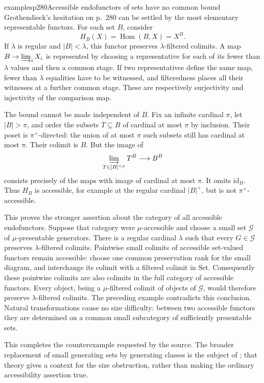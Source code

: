 \begin{dcomment}{examples}{p280}{Accessible endofunctors of sets have no common bound}
Grothendieck's hesitation on p.~280 can be settled by the most elementary representable functors. For each set $B$, consider
\[
 H_B(X)=\operatorname{Hom}(B,X)=X^B.
\]
If $\lambda$ is regular and $|B|<\lambda$, this functor preserves $\lambda$-filtered colimits. A map $B\to\varinjlim_iX_i$ is represented by choosing a representative for each of its fewer than $\lambda$ values and then a common stage. If two representatives define the same map, fewer than $\lambda$ equalities have to be witnessed, and filteredness places all their witnesses at a further common stage. These are respectively surjectivity and injectivity of the comparison map.

The bound cannot be made independent of $B$. Fix an infinite cardinal $\pi$, let $|B|>\pi$, and order the subsets $T\subseteq B$ of cardinal at most $\pi$ by inclusion. Their poset is $\pi^+$-directed: the union of at most $\pi$ such subsets still has cardinal at most $\pi$. Their colimit is $B$. But the image of
\[
 \varinjlim_{T\in[B]^{\leq\pi}} T^B\longrightarrow B^B
\]
consists precisely of the maps with image of cardinal at most $\pi$. It omits $\mathrm{id}_B$. Thus $H_B$ is accessible, for example at the regular cardinal $|B|^+$, but is not $\pi^+$-accessible.

This proves the stronger assertion about the category of all accessible endofunctors. Suppose that category were $\mu$-accessible and choose a small set $\mathcal G$ of $\mu$-presentable generators. There is a regular cardinal $\lambda$ such that every $G\in\mathcal G$ preserves $\lambda$-filtered colimits. Pointwise small colimits of accessible set-valued functors remain accessible: choose one common preservation rank for the small diagram, and interchange its colimit with a filtered colimit in $\mathrm{Set}$. Consequently these pointwise colimits are also colimits in the full category of accessible functors. Every object, being a $\mu$-filtered colimit of objects of $\mathcal G$, would therefore preserve $\lambda$-filtered colimits. The preceding example contradicts this conclusion. Natural transformations cause no size difficulty: between two accessible functors they are determined on a common small subcategory of sufficiently presentable sets.

This completes the counterexample requested by the source. The broader replacement of small generating sets by generating classes is the subject of \citet[Definition 2.1 and Examples 2.2]{ChornyRosicky2012}; that theory gives a context for the size obstruction, rather than making the ordinary accessibility assertion true.
\end{dcomment}

